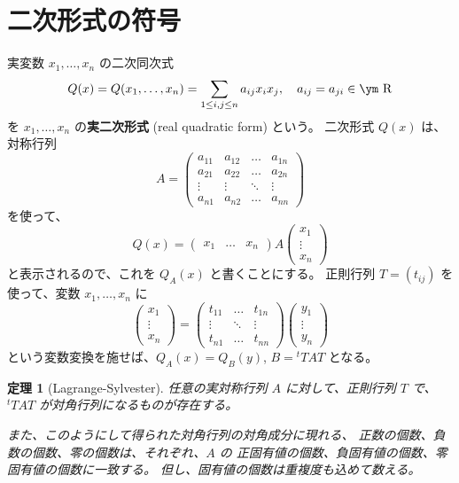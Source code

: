 \documentclass[a4paper]{jsarticle}
\newtheorem{Theorem}{定理}[section]
\theoremstyle{definition}
\theoremstyle{remark}
\newcommand{\R}{\text{\ym R}}
\begin{document}
\section{二次形式の符号}
実変数 $x_1,\dots, x_n$ の二次同次式
\[
Q(x) = Q(x_1, \dots, x_n) 
= \sum_{1 \leq i, j \leq n} a_{ij} x_ix_j, 
\quad a_{ij} = a_{ji} \in \R
\]
を $x_1,\dots, x_n$ の{\bf 実二次形式} (real quadratic form) という。
二次形式 $Q(x)$ は、対称行列
\[
A = 
\begin{pmatrix}
a_{11} & a_{12} & \dots & a_{1n}\\
a_{21} & a_{22} & \dots & a_{2n}\\
\vdots & \vdots & \ddots & \vdots\\
a_{n1} & a_{n2} & \dots & a_{nn}
\end{pmatrix}
\]
を使って、
\[
Q(x) = 
\begin{pmatrix}
x_1 & \dots & x_n
\end{pmatrix}
A 
\begin{pmatrix}
x_1\\
\vdots\\
x_n
\end{pmatrix}
\]
と表示されるので、これを $Q_A(x)$ と書くことにする。
正則行列 $T = (t_{ij})$ を使って、変数 $x_1, \dots, x_n$ に
\[
\begin{pmatrix}
x_1\\
\vdots\\
x_n
\end{pmatrix}
= 
\begin{pmatrix}
t_{11} & \dots & t_{1n}\\
\vdots & \ddots &\vdots\\
t_{n1} & \dots & t_{nn}
\end{pmatrix}
\begin{pmatrix}
y_1\\
\vdots\\
y_n
\end{pmatrix}
\]
という変数変換を施せば、$Q_A(x) = Q_B(y)$, 
$B = {}^tT AT$ となる。

\begin{Theorem}[Lagrange-Sylvester]
任意の実対称行列 $A$ に対して、正則行列 $T$ で、
${}^tT AT$ が対角行列になるものが存在する。

また、このようにして得られた対角行列の対角成分に現れる、
正数の個数、負数の個数、零の個数は、それぞれ、$A$ の
正固有値の個数、負固有値の個数、零固有値の個数に一致する。
但し、固有値の個数は重複度も込めて数える。
\end{Theorem}
\end{document}
